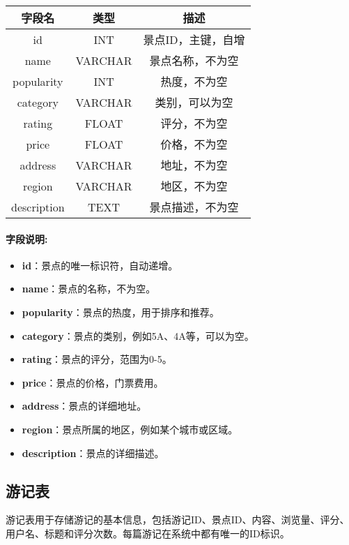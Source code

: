 \documentclass{ctexart}
\begin{document}
\begin{center}
    \begin{tabular}{ccc}
        \toprule
        字段名         & 类型      & 描述         \\
        \midrule
        id          & INT     & 景点ID，主键，自增 \\
        name        & VARCHAR & 景点名称，不为空   \\
        popularity  & INT     & 热度，不为空     \\
        category    & VARCHAR & 类别，可以为空    \\
        rating      & FLOAT   & 评分，不为空     \\
        price       & FLOAT   & 价格，不为空     \\
        address     & VARCHAR & 地址，不为空     \\
        region      & VARCHAR & 地区，不为空     \\
        description & TEXT    & 景点描述，不为空   \\
        \bottomrule
    \end{tabular}
\end{center}

\paragraph{字段说明:}
\begin{itemize}
    \item \textbf{id}：景点的唯一标识符，自动递增。
    \item \textbf{name}：景点的名称，不为空。
    \item \textbf{popularity}：景点的热度，用于排序和推荐。
    \item \textbf{category}：景点的类别，例如5A、4A等，可以为空。
    \item \textbf{rating}：景点的评分，范围为0-5。
    \item \textbf{price}：景点的价格，门票费用。
    \item \textbf{address}：景点的详细地址。
    \item \textbf{region}：景点所属的地区，例如某个城市或区域。
    \item \textbf{description}：景点的详细描述。
\end{itemize}

\subsection{游记表}
游记表用于存储游记的基本信息，包括游记ID、景点ID、内容、浏览量、评分、用户名、标题和评分次数。每篇游记在系统中都有唯一的ID标识。
\end{document}
